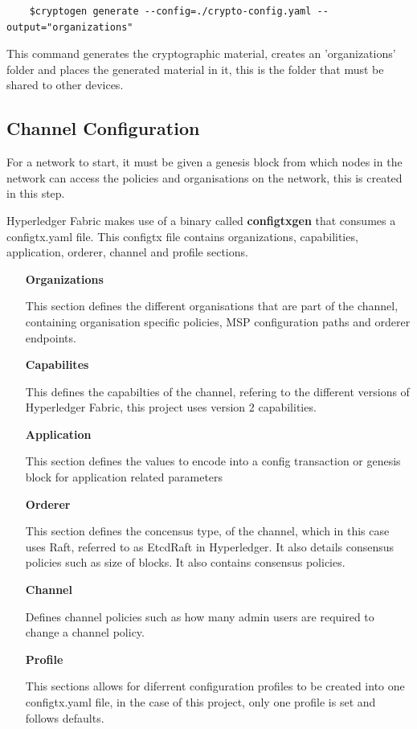 \begin{verbatim}
    $cryptogen generate --config=./crypto-config.yaml --output="organizations"
\end{verbatim}

This command generates the cryptographic material, creates an 'organizations' folder and places the generated material in it, this is the folder that must be shared to other devices.

\subsection{Channel Configuration}

For a network to start, it must be given a genesis block from which nodes in the network can access the policies and organisations on the network, this is created in this step.

Hyperledger Fabric makes use of a binary called \textbf{configtxgen} that consumes a configtx.yaml file. This configtx file contains organizations, capabilities, application, orderer, channel and profile sections.


\begin{itemize}
    \item[\textbf{Organizations}]
        
        This section defines the different organisations that are part of the channel, containing organisation specific policies, MSP configuration paths and orderer endpoints.
    \item[\textbf{Capabilites}]
        
        This defines the capabilties of the channel, refering to the different versions of Hyperledger Fabric, this project uses version 2 capabilities.
    \item[\textbf{Application}]
    
        This section defines the values to encode into a config transaction or genesis block for application related parameters
        
    \item[\textbf{Orderer}]
    
        This section defines the concensus type, of the channel, which in this case uses Raft, referred to as EtcdRaft in Hyperledger.  It also details consensus policies such as size of blocks. It also contains consensus policies.
    \item[\textbf{Channel}]
    
        Defines channel policies such as how many admin users are required to change a channel policy.
    \item[\textbf{Profile}]
    
        This sections allows for diferrent configuration profiles to be created into one configtx.yaml file, in the case of this project, only one profile is set and follows defaults.
\end{itemize}

